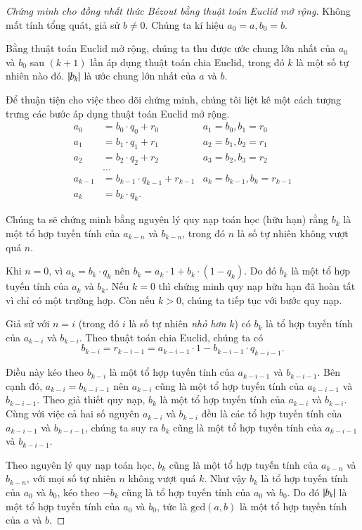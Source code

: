 \begin{proof}[Chứng minh cho đồng nhất thức B\'{e}zout bằng thuật toán Euclid mở rộng]
	Không mất tính tổng quát, giả sử $b\ne 0$. Chúng ta kí hiệu $a_{0} = a, b_{0} = b$.

	Bằng thuật toán Euclid mở rộng, chúng ta thu được ước chung lớn nhất của $a_{0}$ và $b_{0}$ sau $(k+1)$ lần áp dụng thuật toán chia Euclid, trong đó $k$ là một số tự nhiên nào đó. $\left\vert{b_{k}}\right\vert$ là ước chung lớn nhất của $a$ và $b$.

	Để thuận tiện cho việc theo dõi chứng minh, chúng tôi liệt kê một cách tượng trưng các bước áp dụng thuật toán Euclid mở rộng.
	\begin{align*}
		a_{0}   & = b_{0}\cdot q_{0} + r_{0}       & a_{1} = b_{0}, b_{1} = r_{0}     \\
		a_{1}   & = b_{1}\cdot q_{1} + r_{1}       & a_{2} = b_{1}, b_{2} = r_{1}     \\
		a_{2}   & = b_{2}\cdot q_{2} + r_{2}       & a_{3} = b_{2}, b_{3} = r_{2}     \\
		        & \ldots                                                              \\
		a_{k-1} & = b_{k-1}\cdot q_{k-1} + r_{k-1} & a_{k} = b_{k-1}, b_{k} = r_{k-1} \\
		a_{k}   & = b_{k}\cdot q_{k}.
	\end{align*}

	Chúng ta sẽ chứng minh bằng nguyên lý quy nạp toán học (hữu hạn) rằng $b_{k}$ là một tổ hợp tuyến tính của $a_{k-n}$ và $b_{k-n}$, trong đó $n$ là số tự nhiên không vượt quá $n$.

	Khi $n = 0$, vì $a_{k} = b_{k}\cdot q_{k}$ nên $b_{k} = a_{k}\cdot 1 + b_{k}\cdot (1 - q_{k})$.  Do đó $b_{k}$ là một tổ hợp tuyến tính của $a_{k}$ và $b_{k}$. Nếu $k = 0$ thì chứng minh quy nạp hữu hạn đã hoàn tất vì chỉ có một trường hợp. Còn nếu $k > 0$, chúng ta tiếp tục với bước quy nạp.

	Giả sử với $n = i$ (trong đó $i$ là số tự nhiên \textit{nhỏ hơn} $k$) có $b_{k}$ là tổ hợp tuyến tính của $a_{k-i}$ và $b_{k-i}$. Theo thuật toán chia Euclid, chúng ta có
	\[
		b_{k-i} = r_{k-i-1} = a_{k-i-1}\cdot 1 - b_{k-i-1}\cdot q_{k-i-1}.
	\]

	Điều này kéo theo $b_{k-i}$ là một tổ hợp tuyến tính của $a_{k-i-1}$ và $b_{k-i-1}$. Bên cạnh đó, $a_{k-i} = b_{k-i-1}$ nên $a_{k-i}$ cũng là một tổ hợp tuyến tính của $a_{k-i-1}$ và $b_{k-i-1}$. Theo giả thiết quy nạp, $b_{k}$ là một tổ hợp tuyến tính của $a_{k-i}$ và $b_{k-i}$. Cùng với việc cả hai số nguyên $a_{k-i}$ và $b_{k-i}$ đều là các tổ hợp tuyến tính của $a_{k-i-1}$ và $b_{k-i-1}$, chúng ta suy ra $b_{k}$ cũng là một tổ hợp tuyến tính của $a_{k-i-1}$ và $b_{k-i-1}$.

	Theo nguyên lý quy nạp toán học, $b_{k}$ cũng là một tổ hợp tuyến tính của $a_{k-n}$ và $b_{k-n}$, với mọi số tự nhiên $n$ không vượt quá $k$. Như vậy $b_{k}$ là tổ hợp tuyến tính của $a_{0}$ và $b_{0}$, kéo theo $-b_{k}$ cũng là tổ hợp tuyến tính của $a_{0}$ và $b_{0}$. Do đó $\left\vert{b_{k}}\right\vert$ là một tổ hợp tuyến tính của $a_{0}$ và $b_{0}$, tức là $\text{gcd}(a, b)$ là một tổ hợp tuyến tính của $a$ và $b$.
\end{proof}

